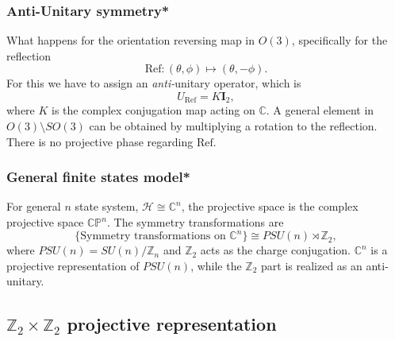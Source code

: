\documentclass[
]{scrartcl}
\numberwithin{equation}{section}
\theoremstyle{definition}
\theoremstyle{definition}
\theoremstyle{definition}
\theoremstyle{definition}
\theoremstyle{remark}
\begin{document}
\hypertarget{anti-unitary-symmetry}{%
\subsubsection{Anti-Unitary symmetry*}\label{anti-unitary-symmetry}}

What happens for the orientation reversing map in \(O(3)\), specifically for the reflection
\begin{equation}
  \label{eq:reflection}
  \mathrm{Ref}: (\theta,\phi) \mapsto (\theta,-\phi).
\end{equation}
For this we have to assign an \emph{anti-}unitary operator, which is
\begin{equation}
  \label{eq:Uref}
  U_{\mathrm{Ref}} = K \mathbf{I}_2,
\end{equation}
where \(K\) is the complex conjugation map acting on \(\mathbb{C}\).
A general element in \(O(3)\setminus SO(3)\) can be obtained by multiplying a rotation to the reflection.
There is no projective phase regarding \(\mathrm{Ref}\).

\hypertarget{general-finite-states-model}{%
\subsubsection{General finite states model*}\label{general-finite-states-model}}

For general \(n\) state system, \(\mathcal{H} \cong \mathbb{C}^n\), the projective space is the complex projective space \(\mathbb{CP}^n\). The symmetry transformations are
\begin{equation}
  \label{eq:TisPSU}
  \{\text{Symmetry transformations on $\mathbb{C}^n$}\} \cong PSU(n)\rtimes \mathbb{Z}_2,
\end{equation}
where \(PSU(n) = SU(n)/\mathbb{Z}_n\) and \(\mathbb{Z}_2\) acts as the charge conjugation.
\(\mathbb{C}^n\) is a projective representation of \(PSU(n)\), while the \(\mathbb{Z}_2\) part is realized as an anti-unitary.

\hypertarget{Z2Z2}{%
\subsection{\texorpdfstring{\(\mathbb{Z}_2\times \mathbb{Z}_2\) projective representation}{\textbackslash mathbb\{Z\}\_2\textbackslash times \textbackslash mathbb\{Z\}\_2 projective representation}}\label{Z2Z2}}
\end{document}
